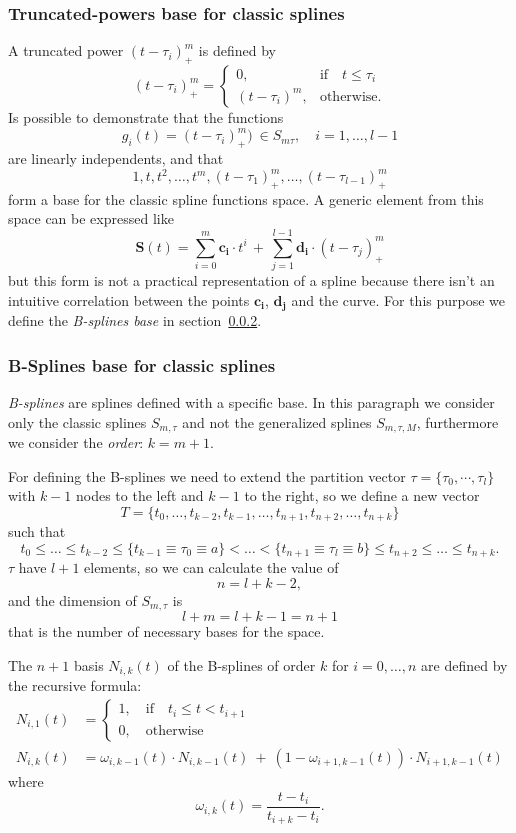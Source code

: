 \documentclass[a4paper]{article}
\begin{document}
\subsubsection{Truncated-powers base for classic splines}\label{sec:truncpow}
A truncated power $(t-\tau_i)_+^m$ is
defined by
$$
(t-\tau_i)_+^m=
\begin{cases}
  0,&\mbox{if}\quad t\leq\tau_i\\
  (t-\tau_i)^m, &\mbox{otherwise}.
\end{cases}
$$
Is possible to demonstrate that the functions
$$
g_i(t)=(t-\tau_i)_+^m)\ \in S_{m\tau},\quad i=1,\dots,l-1
$$
are linearly independents, and that
$$
1,t,t^2,\dots,t^m,(t-\tau_1)_+^m,\dots,(t-\tau_{l-1})_+^m
$$
form a base for the classic spline functions space. A generic element
from this space can be expressed like
$$
\mathbf{S}(t)=\sum_{i=0}^m \mathbf{c_i}\cdot t^i\, +\, \sum_{j=1}^{l-1} \mathbf{d_i}\cdot (t-\tau_j)_+^m
$$
but this form is not a practical representation of a spline because
there isn't an intuitive correlation between the points
$\mathbf{c_i}$, $\mathbf{d_j}$ and the curve. For this purpose we
define the \emph{B-splines base} in section~\ref{sec:bsplines}.

\subsubsection{B-Splines base for classic splines}\label{sec:bsplines}
\emph{B-splines} are splines defined with a specific base. In this
paragraph we consider only the classic splines $S_{m,\tau}$ and not
the generalized splines $S_{m,\tau,M}$, furthermore we consider the
\emph{order}: $k=m+1$.

For defining the B-splines we need to extend the partition vector
$\tau=\{\tau_0,\cdots,\tau_l\}$ with $k-1$ nodes to the left and $k-1$ to
the right, so we define a new vector
$$
T=\{t_0,\dots,t_{k-2},t_{k-1},\dots,t_{n+1},t_{n+2},\dots,t_{n+k}\}
$$
such that
$$
t_0\leq\dots\leq t_{k-2}\leq \{t_{k-1}\equiv\tau_0\equiv a\}<\dots<
\{t_{n+1}\equiv\tau_l\equiv b\}\leq t_{n+2}\leq\dots\leq t_{n+k}.
$$
$\tau$ have $l+1$ elements, so we can calculate the value of
$$
n=l+k-2,
$$
and the dimension of $S_{m,\tau}$ is
$$
l+m=l+k-1=n+1
$$
that is the number of necessary bases for the space.

The $n+1$ basis $N_{i,k}(t)$ of the B-splines of order $k$ for
$i=0,\dots,n$ are defined by the 
recursive formula:
\begin{align*}
  N_{i,1}(t) &=
  \begin{cases}
    1,\quad \mbox{if}\quad t_i\leq t<t_{i+1}\\
    0,\quad \mbox{otherwise}
  \end{cases}\\
  N_{i,k}(t) &= \omega_{i,k-1}(t)\cdot N_{i,k-1}(t)\ +\
  (1-\omega_{i+1,k-1}(t))\cdot N_{i+1,k-1}(t)
\end{align*}
where
$$
\omega_{i,k}(t) = \frac{t-t_i}{t_{i+k}-t_i}.
$$
\end{document}
